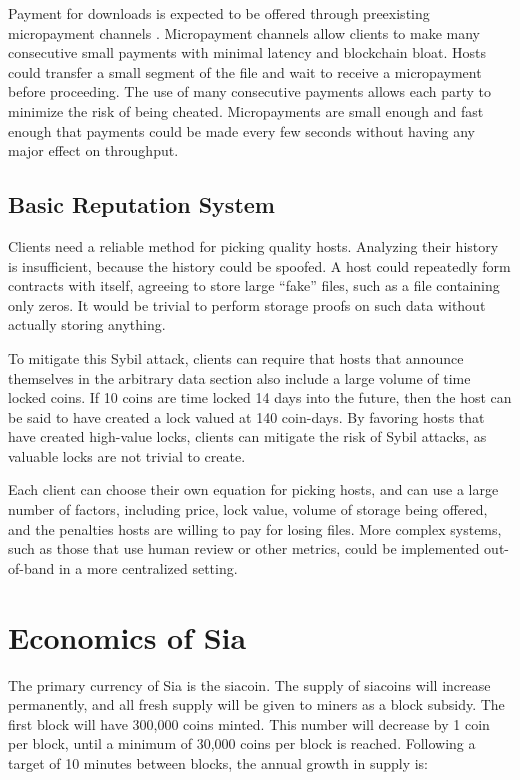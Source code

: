 \documentclass[twocolumn]{article}
\begin{document}
Payment for downloads is expected to be offered through preexisting micropayment channels \cite{mpc}.
Micropayment channels allow clients to make many consecutive small payments with minimal latency and blockchain bloat.
Hosts could transfer a small segment of the file and wait to receive a micropayment before proceeding.
The use of many consecutive payments allows each party to minimize the risk of being cheated.
Micropayments are small enough and fast enough that payments could be made every few seconds without having any major effect on throughput.

\subsection{Basic Reputation System}
Clients need a reliable method for picking quality hosts.
Analyzing their history is insufficient, because the history could be spoofed.
A host could repeatedly form contracts with itself, agreeing to store large ``fake'' files, such as a file containing only zeros.
It would be trivial to perform storage proofs on such data without actually storing anything.

To mitigate this Sybil attack, clients can require that hosts that announce themselves in the arbitrary data section also include a large volume of time locked coins.
If 10 coins are time locked 14 days into the future, then the host can be said to have created a lock valued at 140 coin-days.
By favoring hosts that have created high-value locks, clients can mitigate the risk of Sybil attacks, as valuable locks are not trivial to create.

Each client can choose their own equation for picking hosts, and can use a large number of factors, including price, lock value, volume of storage being offered, and the penalties hosts are willing to pay for losing files.
More complex systems, such as those that use human review or other metrics, could be implemented out-of-band in a more centralized setting.

\section{Economics of Sia}
The primary currency of Sia is the siacoin.
The supply of siacoins will increase permanently, and all fresh supply will be given to miners as a block subsidy.
The first block will have 300,000 coins minted.
This number will decrease by 1 coin per block, until a minimum of 30,000 coins per block is reached.
Following a target of 10 minutes between blocks, the annual growth in supply is:\\
\end{document}
